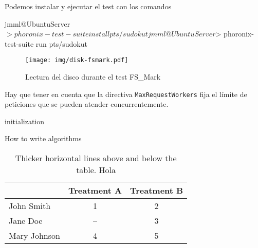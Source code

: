\documentclass[size=a4, parskip=half, titlepage=false, toc=flat, toc=bib, 12pt]{scrartcl}
\begin{document}
\newpage

Podemos instalar y ejecutar el test con los comandos
\begin{shell}
jmml@UbuntuServer $> phoronix-test-suite install pts/sudokut
jmml@UbuntuServer $> phoronix-test-suite run pts/sudokut
\end{shell}

\begin{figure}[ht]
  \label{fig:disk-fsmark}
  \texttt{[image: img/disk-fsmark.pdf]}
  \caption{Lectura del disco durante el test FS\_Mark}
\end{figure}

\begin{error}
  Hay que tener en cuenta que la directiva \texttt{MaxRequestWorkers} fija el límite de peticiones que se pueden atender concurrentemente.
\end{error}

\begin{algorithm}[ht]
  initialization\;
  \caption{How to write algorithms}
 \end{algorithm}

 \begin{table}[ht]
  \centering
  \begin{tabular}[t]{lcc}
  \toprule
  &Treatment A&Treatment B\\
  \midrule
  John Smith&1&2\\
  Jane Doe&--&3\\
  Mary Johnson&4&5\\
  \bottomrule
  \end{tabular}
  \caption{Thicker horizontal lines above and below the table. Hola}
  \end{table}%

\end{document}
